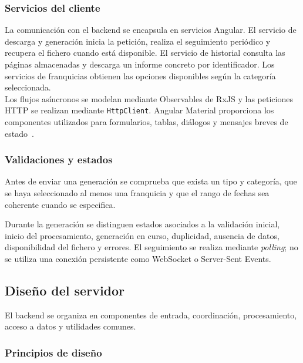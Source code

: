 \documentclass[11pt,a4paper,titlepage,oneside]{report}
\begin{document}
\subsubsection{Servicios del cliente}

La comunicación con el backend se encapsula en servicios Angular. El servicio
de descarga y generación inicia la petición, realiza el seguimiento periódico y
recupera el fichero cuando está disponible. El servicio de historial consulta
las páginas almacenadas y descarga un informe concreto por identificador. Los
servicios de franquicias obtienen las opciones disponibles según la categoría
seleccionada. \\

Los flujos asíncronos se modelan mediante Observables de RxJS y las peticiones
HTTP se realizan mediante \texttt{HttpClient}. Angular Material proporciona los
componentes utilizados para formularios, tablas, diálogos y mensajes breves de
estado~\cite{AngularMaterialDocs,RxJSDocs}.

\subsubsection{Validaciones y estados}

Antes de enviar una generación se comprueba que exista un tipo y categoría,
que se haya seleccionado al menos una franquicia y que el rango de fechas sea
coherente cuando se especifica.

Durante la generación se distinguen estados asociados a la validación inicial,
inicio del procesamiento, generación en curso, duplicidad, ausencia de datos,
disponibilidad del fichero y errores. El seguimiento se realiza mediante
\textit{polling}; no se utiliza una conexión persistente como WebSocket o
Server-Sent Events.

\subsection{Diseño del servidor}

El backend se organiza en componentes de entrada, coordinación, procesamiento,
acceso a datos y utilidades comunes.

\subsubsection{Principios de diseño}
\end{document}
